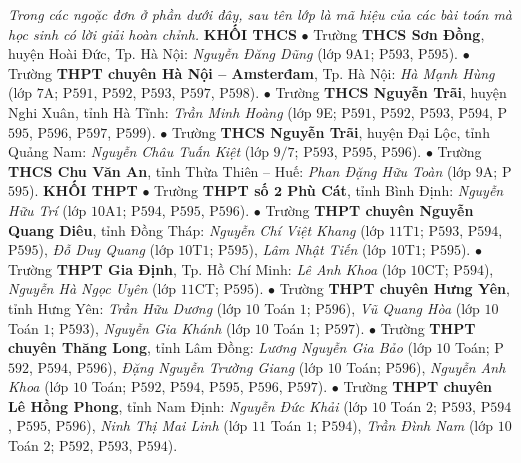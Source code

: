 \begin{multicols}{2}
	\textit{Trong các ngoặc đơn ở phần dưới đây, sau tên lớp là mã hiệu của các bài toán mà học sinh có lời giải hoàn chỉnh.}
	\vskip 0.05cm
	\textbf{\color{thachthuctoanhoc}KHỐI THCS}
	\vskip 0.05cm
	$\bullet$ Trường \textbf{\color{thachthuctoanhoc}THCS Sơn Đồng}, huyện Hoài Đức, Tp. Hà Nội: \textit{Nguyễn Đăng Dũng} (lớp $9$A$1$; P$593$, P$595$).
	\vskip 0.05cm
	$\bullet$ Trường \textbf{\color{thachthuctoanhoc}THPT chuyên Hà Nội -- Amsterđam}, Tp. Hà Nội: \textit{Hà Mạnh Hùng} (lớp $7$A; P$591$, P$592$, P$593$, P$597$, P$598$).
	\vskip 0.05cm
	$\bullet$ Trường \textbf{\color{thachthuctoanhoc}THCS Nguyễn Trãi}, huyện Nghi Xuân, tỉnh Hà Tĩnh: \textit{Trần Minh Hoàng} (lớp $9$E; P$591$, P$592$, P$593$, P$594$, P$595$, P$596$, P$597$, P$599$).
	\vskip 0.05cm
	$\bullet$ Trường \textbf{\color{thachthuctoanhoc}THCS Nguyễn Trãi}, huyện Đại Lộc, tỉnh Quảng Nam: \textit{Nguyễn Châu Tuấn Kiệt} (lớp $9/7$; P$593$, P$595$, P$596$).
	\vskip 0.05cm
	$\bullet$ Trường \textbf{\color{thachthuctoanhoc}THCS Chu Văn An}, tỉnh Thừa Thiên -- Huế: \textit{Phan Đặng Hữu Toàn} (lớp $9$A; P$595$).
	\vskip 0.05cm
	\textbf{\color{thachthuctoanhoc}KHỐI THPT}
	\vskip 0.05cm
	$\bullet$ Trường \textbf{\color{thachthuctoanhoc}THPT số $\pmb{2}$ Phù Cát}, tỉnh Bình Định: \textit{Nguyễn Hữu Trí} (lớp $10$A$1$; P$594$, P$595$, P$596$).
	\vskip 0.05cm
	$\bullet$ Trường \textbf{\color{thachthuctoanhoc}THPT chuyên Nguyễn Quang Diêu}, tỉnh Đồng Tháp: \textit{Nguyễn Chí Việt Khang} (lớp $11$T$1$; P$593$, P$594$, P$595$), \textit{Đỗ Duy Quang} (lớp $10$T$1$; P$595$), \textit{Lâm Nhật Tiến} (lớp $10$T$1$; P$595$).
	\vskip 0.05cm
	$\bullet$ Trường \textbf{\color{thachthuctoanhoc}THPT Gia Định}, Tp. Hồ Chí Minh: \textit{Lê Anh Khoa} (lớp $10$CT; P$594$), \textit{Nguyễn Hà Ngọc Uyên} (lớp $11$CT; P$595$).
	\vskip 0.05cm
	$\bullet$ Trường \textbf{\color{thachthuctoanhoc}THPT chuyên Hưng Yên}, tỉnh Hưng Yên: \textit{Trần Hữu Dương} (lớp $10$ Toán $1$; P$596$), \textit{Vũ Quang Hòa} (lớp $10$ Toán $1$; P$593$), \textit{Nguyễn Gia Khánh} (lớp $10$ Toán $1$; P$597$).
	\vskip 0.05cm
	$\bullet$ Trường \textbf{\color{thachthuctoanhoc}THPT chuyên Thăng Long}, tỉnh Lâm Đồng: \textit{Lương Nguyễn Gia Bảo} (lớp $10$ Toán; P$592$, P$594$, P$596$), \textit{Đặng Nguyễn Trường Giang} (lớp $10$ Toán; P$596$), \textit{Nguyễn Anh Khoa} (lớp $10$ Toán; P$592$, P$594$, P$595$, P$596$, P$597$).
	\vskip 0.05cm
	$\bullet$ Trường \textbf{\color{thachthuctoanhoc}THPT chuyên Lê Hồng Phong}, tỉnh Nam Định: \textit{Nguyễn Đức Khải} (lớp $10$ Toán $2$; P$593$, P$594$, P$595$, P$596$), \textit{Ninh Thị Mai Linh} (lớp $11$ Toán $1$; P$594$), \textit{Trần Đình Nam} (lớp $10$ Toán $2$; P$592$, P$593$, P$594$).

\end{multicols}
